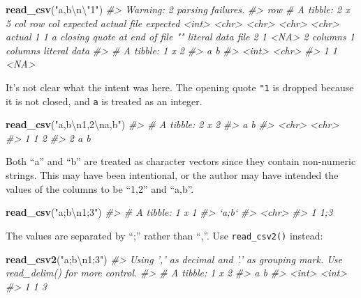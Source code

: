 \documentclass[]{book}
\newenvironment{Shaded}{\begin{snugshade}}{\end{snugshade}}
\newcommand{\CharTok}[1]{\textcolor[rgb]{0.31,0.60,0.02}{#1}}
\newcommand{\CommentTok}[1]{\textcolor[rgb]{0.56,0.35,0.01}{\textit{#1}}}
\newcommand{\KeywordTok}[1]{\textcolor[rgb]{0.13,0.29,0.53}{\textbf{#1}}}
\newcommand{\NormalTok}[1]{#1}
\newcommand{\StringTok}[1]{\textcolor[rgb]{0.31,0.60,0.02}{#1}}
\theoremstyle{plain}
\theoremstyle{remark}
\begin{document}
\begin{Shaded}
\begin{Highlighting}[]
\KeywordTok{read_csv}\NormalTok{(}\StringTok{"a,b}\CharTok{\textbackslash{}n\textbackslash{}"}\StringTok{1"}\NormalTok{)}
\CommentTok{#> Warning: 2 parsing failures.}
\CommentTok{#> row # A tibble: 2 x 5 col     row col   expected                     actual    file         expected   <int> <chr> <chr>                        <chr>     <chr>        actual 1     1 a     closing quote at end of file ""        literal data file 2     1 <NA>  2 columns                    1 columns literal data}
\CommentTok{#> # A tibble: 1 x 2}
\CommentTok{#>       a b    }
\CommentTok{#>   <int> <chr>}
\CommentTok{#> 1     1 <NA>}
\end{Highlighting}
\end{Shaded}

It's not clear what the intent was here. The opening quote \texttt{"1}
is dropped because it is not closed, and \texttt{a} is treated as an
integer.

\begin{Shaded}
\begin{Highlighting}[]
\KeywordTok{read_csv}\NormalTok{(}\StringTok{"a,b}\CharTok{\textbackslash{}n}\StringTok{1,2}\CharTok{\textbackslash{}n}\StringTok{a,b"}\NormalTok{)}
\CommentTok{#> # A tibble: 2 x 2}
\CommentTok{#>   a     b    }
\CommentTok{#>   <chr> <chr>}
\CommentTok{#> 1 1     2    }
\CommentTok{#> 2 a     b}
\end{Highlighting}
\end{Shaded}

Both ``a'' and ``b'' are treated as character vectors since they contain
non-numeric strings. This may have been intentional, or the author may
have intended the values of the columns to be ``1,2'' and ``a,b''.

\begin{Shaded}
\begin{Highlighting}[]
\KeywordTok{read_csv}\NormalTok{(}\StringTok{"a;b}\CharTok{\textbackslash{}n}\StringTok{1;3"}\NormalTok{)}
\CommentTok{#> # A tibble: 1 x 1}
\CommentTok{#>   `a;b`}
\CommentTok{#>   <chr>}
\CommentTok{#> 1 1;3}
\end{Highlighting}
\end{Shaded}

The values are separated by ``;'' rather than ``,''. Use
\texttt{read\_csv2()} instead:

\begin{Shaded}
\begin{Highlighting}[]
\KeywordTok{read_csv2}\NormalTok{(}\StringTok{"a;b}\CharTok{\textbackslash{}n}\StringTok{1;3"}\NormalTok{)}
\CommentTok{#> Using ',' as decimal and '.' as grouping mark. Use read_delim() for more control.}
\CommentTok{#> # A tibble: 1 x 2}
\CommentTok{#>       a     b}
\CommentTok{#>   <int> <int>}
\CommentTok{#> 1     1     3}
\end{Highlighting}
\end{Shaded}
\end{document}
